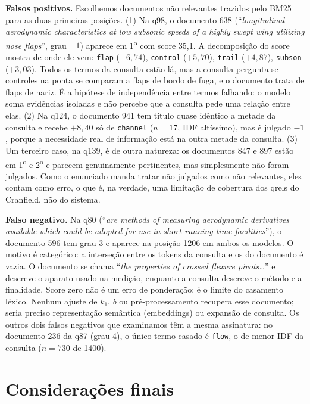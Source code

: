 \documentclass[10pt,twocolumn,a4paper]{article}
\begin{document}
\textbf{Falsos positivos.} Escolhemos documentos não relevantes trazidos pelo
BM25 para as duas primeiras posições. (1) Na q98, o documento 638
(``\textit{longitudinal aerodynamic characteristics at low subsonic speeds of a
highly swept wing utilizing nose flaps}'', grau $-1$) aparece em
1\textsuperscript{o} com score 35,1. A decomposição do score mostra de onde ele
vem: \texttt{flap} ($+6{,}74$), \texttt{control} ($+5{,}70$), \texttt{trail}
($+4{,}87$), \texttt{subson} ($+3{,}03$). Todos os termos da consulta estão lá,
mas a consulta pergunta se controles na ponta se comparam a flaps de bordo de
fuga, e o documento trata de flaps de nariz. É a hipótese de independência entre
termos falhando: o modelo soma evidências isoladas e não percebe que a consulta
pede uma relação entre elas. (2) Na q124, o documento 941 tem título quase
idêntico a metade da consulta e recebe $+8{,}40$ só de \texttt{channel}
($n = 17$, IDF altíssimo), mas é julgado $-1$, porque a necessidade real de
informação está na outra metade da consulta. (3) Um terceiro caso, na q139, é de
outra natureza: os documentos 847 e 897 estão em 1\textsuperscript{o} e
2\textsuperscript{o} e parecem genuinamente pertinentes, mas simplesmente não
foram julgados. Como o enunciado manda tratar não julgados como não relevantes,
eles contam como erro, o que é, na verdade, uma limitação de cobertura dos qrels
do Cranfield, não do sistema.

\textbf{Falso negativo.} Na q80 (``\textit{are methods of measuring aerodynamic
derivatives available which could be adopted for use in short running time
facilities}''), o documento 596 tem grau 3 e aparece na posição 1206 em ambos os
modelos. O motivo é categórico: a interseção entre os tokens da consulta e os do
documento é vazia. O documento se chama ``\textit{the properties of crossed
flexure pivots\dots}'' e descreve o aparato usado na medição, enquanto a consulta
descreve o método e a finalidade. Score zero não é um erro de ponderação: é o
limite do casamento léxico. Nenhum ajuste de $k_1$, $b$ ou pré-processamento
recupera esse documento; seria preciso representação semântica (embeddings) ou
expansão de consulta. Os outros dois falsos negativos que examinamos têm a mesma
assinatura: no documento 236 da q87 (grau 4), o único termo casado é
\texttt{flow}, o de menor IDF da consulta ($n = 730$ de 1400).

\section{Considerações finais}
\end{document}
